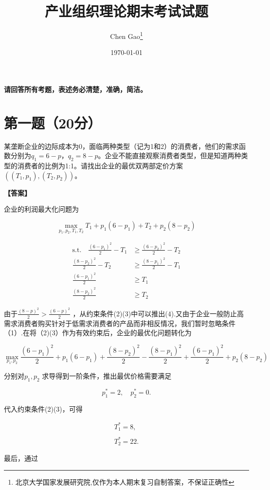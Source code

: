 \documentclass[12pt]{article}
\begin{document}
\title{产业组织理论期末考试试题}
\author{Chen Gao\thanks{北京大学国家发展研究院,仅作为本人期末复习自制答案，不保证正确性}}
\date{\today}
\maketitle

\medskip
\noindent\textbf{请回答所有考题，表述务必清楚，准确，简洁。}

\section*{第一题（20分）}
某垄断企业的边际成本为0，面临两种类型（记为1和2）的消费者，他们的需求函数分别为$q_1=6-p$，$q_2=8-p$。企业不能直接观察消费者类型，但是知道两种类型的消费者的比例为1:1。请找出企业的最优双两部定价方案$((T_1,p_1),(T_2,p_2))$。

\noindent\textbf{【答案】}

企业的利润最大化问题为

$$\max\limits_{p_1,p_2,T_1,T_2}T_1+p_1(6-p_1)+T_2+p_2(8-p_2)$$

$$\begin{aligned}
\mathrm{s.t.}\quad{\frac{(6-p_{1})^{2}}{2}}-T_{1}& \geq\frac{(6-p_{2})^{2}}{2}-T_{2} \\
\frac{(8-p_{2})^{2}}{2}-T_{2}& \geq\frac{(8-p_{1})^{2}}{2}-T_{1} \\
\frac{(6-p_{1})^{2}}{2}& \geq T_{1} \\
\frac{(8-p_{2})^{2}}{2}& \geq T_{2} 
\end{aligned}$$

由于$\frac{(8-p)^2}2>\frac{(6-p)^2}2$ ，从约束条件(2)(3)中可以推出(4).又由于企业一般防止高需求消费者购买针对于低需求消费者的产品而非相反情况，我们暂时忽略条件（1）.在将（2)(3）作为有效约束后，企业的最优化问题转化为

$$\max\limits_{p_1,p_2}\frac{(6-p_1)^2}{2}+p_1(6-p_1)+\frac{(8-p_2)^2}{2}-\frac{(8-p_1)^2}{2}+\frac{(6-p_1)^2}{2}+p_2(8-p_2)$$

分别对$p_{1},p_{2}$ 求导得到一阶条件，推出最优价格需要满足

$$p_1^*=2,\quad p_2^*=0.$$

代入约束条件(2)(3)，可得

$$\begin{array}{c}T_1^*=8,\\\\T_2^*=22.\end{array}$$

最后，通过
\end{document}
